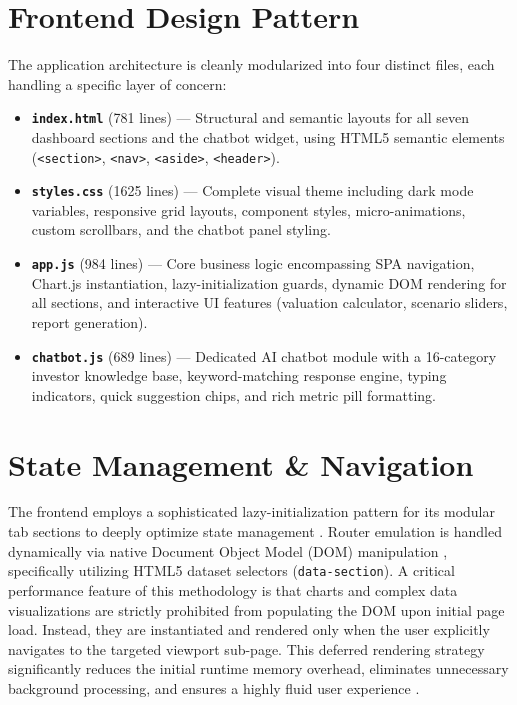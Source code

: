 \documentclass{book}
\begin{document}
\section{Frontend Design Pattern}
The application architecture is cleanly modularized into four distinct files, each handling a specific layer of concern:
\begin{itemize}
    \item \textbf{\texttt{index.html}} (781 lines) --- Structural and semantic layouts for all seven dashboard sections and the chatbot widget, using HTML5 semantic elements \cite{w3chtml5} (\texttt{<section>}, \texttt{<nav>}, \texttt{<aside>}, \texttt{<header>}).
    \item \textbf{\texttt{styles.css}} (1625 lines) --- Complete visual theme including dark mode variables, responsive grid layouts, component styles, micro-animations, custom scrollbars, and the chatbot panel styling.
    \item \textbf{\texttt{app.js}} (984 lines) --- Core business logic encompassing SPA navigation, Chart.js instantiation, lazy-initialization guards, dynamic DOM rendering for all sections, and interactive UI features (valuation calculator, scenario sliders, report generation).
    \item \textbf{\texttt{chatbot.js}} (689 lines) --- Dedicated AI chatbot module with a 16-category investor knowledge base, keyword-matching response engine, typing indicators, quick suggestion chips, and rich metric pill formatting.
\end{itemize}

\section{State Management \& Navigation}
The frontend employs a sophisticated lazy-initialization pattern for its modular tab sections to deeply optimize state management \cite{mikowski2013spa}. Router emulation is handled dynamically via native Document Object Model (DOM) manipulation \cite{mdn2024dom}, specifically utilizing HTML5 dataset selectors (\texttt{data-section}). A critical performance feature of this methodology is that charts and complex data visualizations are strictly prohibited from populating the DOM upon initial page load. Instead, they are instantiated and rendered only when the user explicitly navigates to the targeted viewport sub-page. This deferred rendering strategy significantly reduces the initial runtime memory overhead, eliminates unnecessary background processing, and ensures a highly fluid user experience \cite{nicholls2019spaperformance}.
\end{document}
